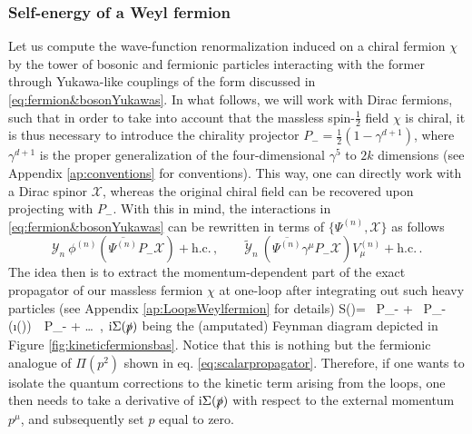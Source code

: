 \subsubsection{Self-energy of a Weyl fermion}
\label{sss:selfenergyfermion}	
Let us compute the wave-function renormalization induced on a chiral fermion $\chi$ by the tower of bosonic and fermionic particles interacting with the former through Yukawa-like couplings of the form discussed in \eqref{eq:fermion&bosonYukawas}. In what follows, we will work with Dirac fermions, such that in order to take into account that the massless spin-$\frac{1}{2}$ field $\chi$ is chiral, it is thus necessary to introduce the  chirality projector $P_{-}=\frac{1}{2}(1-\gamma^{d+1})$, where $\gamma^{d+1}$ is the proper generalization of the four-dimensional $\gamma^5$ to $2k$ dimensions (see Appendix \ref{ap:conventions} for conventions). This way, one can directly work with a Dirac spinor $\mathcal{X}$, whereas the original chiral field can be recovered upon projecting with $P_-$. With this in mind, the interactions in \eqref{eq:fermion&bosonYukawas} can be rewritten in terms of $\{\Psi^{(n)}, \mathcal{X} \}$ as follows
%
\begin{equation}\label{eq:interactionsfermion2}
		\mathcal{Y}_n\ \phi^{(n)} \left( \overline{\Psi^{(n)}} P_{-} \mathcal{X} \right) + \text{h.c.}\, , \qquad  \tilde{\mathcal{Y}}_n\ \left(\overline{\Psi^{(n)}} \gamma^{\mu} P_{-} \mathcal{X} \right) V_{\mu}^{(n)} + \text{h.c.}\, .  
\end{equation}
%
The idea then is to extract the momentum-dependent part of the exact propagator of our massless fermion $\chi$ at one-loop after integrating out such heavy particles (see Appendix \ref{ap:LoopsWeylfermion} for details)
%
\beq\label{eq:Euclexactpropagator}
	S()= \, P_{-} + \, P_{-}\, \left(\i\Sigma()\right)\, \, P_{-} + \ldots\ ,
\eeq
%
$\text{i} \Sigma(\slashed{p})$ being the (amputated) Feynman diagram depicted in Figure \ref{fig:kineticfermionsbas}. Notice that this is nothing but the fermionic analogue of $\Pi(p^2)$ shown in eq. \eqref{eq:scalarpropagator}. Therefore, if one wants to isolate the quantum corrections to the kinetic term arising from the loops, one then needs to take a derivative of $\text{i} \Sigma(\slashed{p})$ with respect to the external momentum $p^{\mu}$, and subsequently set $p$ equal to zero.
	

